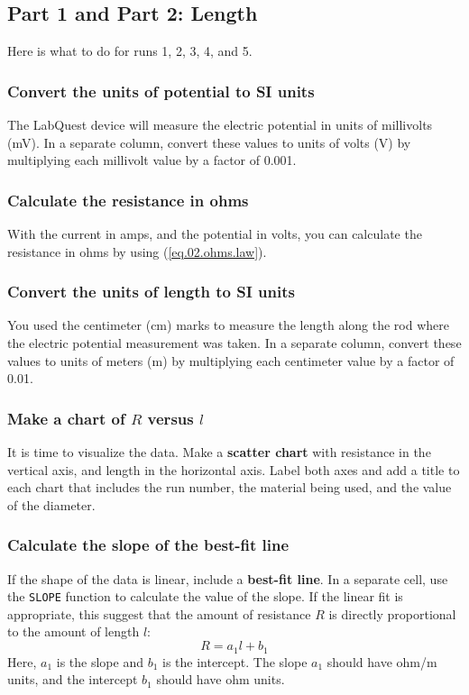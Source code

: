 \subsection{Part 1 and Part 2: Length}
%
Here is what to do for runs 1, 2, 3, 4, and 5.
%
\subsubsection{Convert the units of potential to SI units}
%
The LabQuest device will measure the electric potential in units of millivolts (mV). In a separate column, convert these values to units of volts (V) by multiplying each millivolt value by a factor of 0.001.
%
\subsubsection{Calculate the resistance in ohms}
%
With the current in amps, and the potential in volts, you can calculate the resistance in ohms by using (\ref{eq.02.ohms.law}).
%
\subsubsection{Convert the units of length to SI units}
%
You used the centimeter (cm) marks to measure the length along the rod where the electric potential measurement was taken. In a separate column, convert these values to units of meters (m) by multiplying each centimeter value by a factor of 0.01.
%
\subsubsection{Make a chart of $R$ versus $l$}
%
It is time to visualize the data. Make a \textbf{scatter chart} with resistance in the vertical axis, and length in the horizontal axis. Label both axes and add a title to each chart that includes the run number, the material being used, and the value of the diameter.
%
\subsubsection{Calculate the slope of the best-fit line}
%
If the shape of the data is linear, include a \textbf{best-fit line}. In a separate cell, use the \texttt{SLOPE} function to calculate the value of the slope. If the linear fit is appropriate, this suggest that the amount of resistance $R$ is directly proportional to the amount of length $l$:
\begin{equation}
	R = a_{1} l + b_{1}
\end{equation}
Here, $a_{1}$ is the slope and $b_{1}$ is the intercept. The slope $a_{1}$ should have ohm/m units, and the intercept $b_{1}$ should have ohm units.

